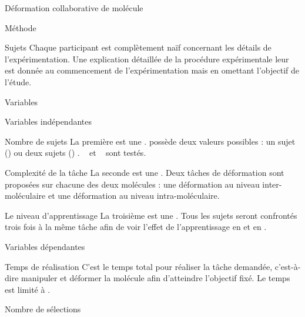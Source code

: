 \documentclass[myfrancais]{mythesis}
\begin{document}
\begin{mychapter}{Déformation collaborative de molécule}
\begin{mysection}{Méthode}
\begin{mysubsection}{Sujets}
				Chaque participant est complètement naïf concernant les détails de l'expérimentation.
				Une explication détaillée de la procédure expérimentale leur est donnée au commencement de l'expérimentation mais en omettant l'objectif de l'étude.
			\end{mysubsection}
			\begin{mysubsection}{Variables}
				\begin{mysubsubsection}{Variables indépendantes}
					\begin{myparagraph}{ Nombre de sujets}
						La première  est une .
						 possède deux valeurs possibles : \og un sujet (\mycf {}) \fg ou \og deux sujets (\mycf {}) \fg.
						\mynum{12}~ et ~ sont testés.
					\end{myparagraph}
					\begin{myparagraph}{ Complexité de la tâche}
						La seconde  est une .
						Deux tâches de déformation sont proposées sur chacune des deux molécules : une déformation au niveau inter-moléculaire et une déformation au niveau intra-moléculaire.
					\end{myparagraph}
					\begin{myparagraph}{ Le niveau d'apprentissage}
						La troisième  est une .
						Tous les sujets seront confrontés trois fois à la même tâche afin de voir l'effet de l'apprentissage en  et en .
					\end{myparagraph}
				\end{mysubsubsection}
				\begin{mysubsubsection}{Variables dépendantes}
					\begin{myparagraph}{ Temps de réalisation}
						C'est le temps total pour réaliser la tâche demandée, c'est-à-dire manipuler et déformer la molécule afin d'atteindre l'objectif fixé.
						Le temps est limité à .
					\end{myparagraph}
					\begin{myparagraph}{ Nombre de sélections}

\end{myparagraph}
\end{mysubsubsection}
\end{mysubsection}
\end{mysection}
\end{mychapter}
\end{document}
